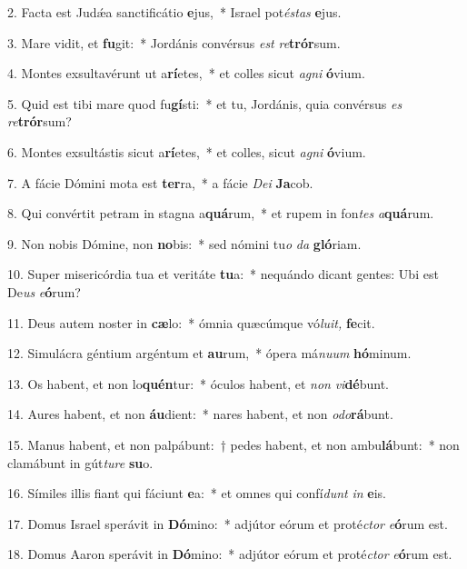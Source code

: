 \item 2. Facta est Judǽa sanctificátio \textbf{e}jus,~* Israel pot\textit{éstas} \textbf{e}jus.
\item 3. Mare vidit, et \textbf{fu}git:~* Jordánis convérsus \textit{est} \textit{re}\textbf{trór}sum.
\item 4. Montes exsultavérunt ut a\textbf{rí}etes,~* et colles sicut \textit{agni} \textbf{ó}vium.
\item 5. Quid est tibi mare quod fu\textbf{gí}sti:~* et tu, Jordánis, quia convérsus \textit{es} \textit{re}\textbf{trór}sum?
\item 6. Montes exsultástis sicut a\textbf{rí}etes,~* et colles, sicut \textit{agni} \textbf{ó}vium.
\item 7. A fácie Dómini mota est \textbf{ter}ra,~* a fácie \textit{Dei} \textbf{Ja}cob.
\item 8. Qui convértit petram in stagna a\textbf{quá}rum,~* et rupem in fon\textit{tes} \textit{a}\textbf{quá}rum.
\item 9. Non nobis Dómine, non \textbf{no}bis:~* sed nómini tu\textit{o} \textit{da} \textbf{gló}riam.
\item 10. Super misericórdia tua et veritáte \textbf{tu}a:~* nequándo dicant gentes: Ubi est De\hspace{0.02em}\textit{us} \textit{e}\textbf{ó}rum?
\item 11. Deus autem noster in \textbf{cæ}lo:~* ómnia quæcúmque vó\textit{luit,} \textbf{fe}cit.
\item 12. Simulácra géntium argéntum et \textbf{au}rum,~* ópera má\textit{nuum} \textbf{hó}minum.
\item 13. Os habent, et non lo\textbf{quén}tur:~* óculos habent, et \textit{non} \textit{vi}\textbf{dé}bunt.
\item 14. Aures habent, et non \textbf{áu}dient:~* nares habent, et non \textit{odo}\textbf{rá}bunt.
\item 15. Manus habent, et non palpábunt:~† pedes habent, et non ambu\textbf{lá}bunt:~* non clamábunt in gút\textit{ture} \textbf{su}o.
\item 16. Símiles illis fiant qui fáciunt \textbf{e}a:~* et omnes qui confí\hspace{0.02em}\textit{dunt} \textit{in} \textbf{e}is.
\item 17. Domus Israel sperávit in \textbf{Dó}mino:~* adjútor eórum et proté\textit{ctor} \textit{e}\textbf{ó}rum est.
\item 18. Domus Aaron sperávit in \textbf{Dó}mino:~* adjútor eórum et proté\textit{ctor} \textit{e}\textbf{ó}rum est.
